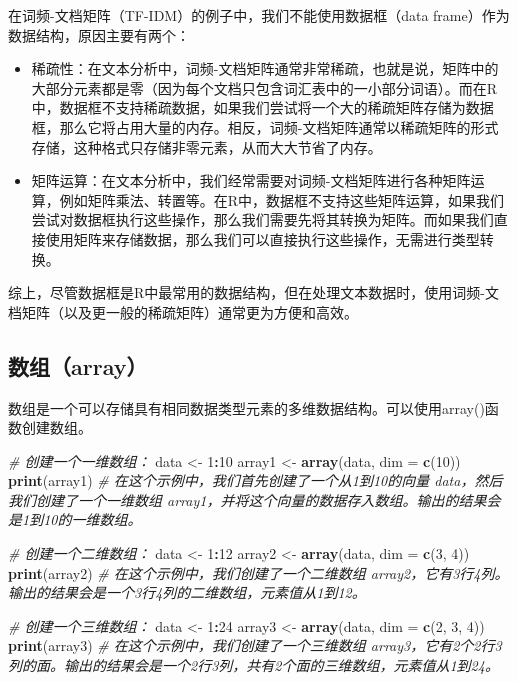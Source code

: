 \documentclass[]{book}
\newenvironment{Shaded}{\begin{snugshade}}{\end{snugshade}}
\newcommand{\CommentTok}[1]{\textcolor[rgb]{0.56,0.35,0.01}{\textit{#1}}}
\newcommand{\DataTypeTok}[1]{\textcolor[rgb]{0.13,0.29,0.53}{#1}}
\newcommand{\DecValTok}[1]{\textcolor[rgb]{0.00,0.00,0.81}{#1}}
\newcommand{\KeywordTok}[1]{\textcolor[rgb]{0.13,0.29,0.53}{\textbf{#1}}}
\newcommand{\NormalTok}[1]{#1}
\newcommand{\OperatorTok}[1]{\textcolor[rgb]{0.81,0.36,0.00}{\textbf{#1}}}
\newcommand{\StringTok}[1]{\textcolor[rgb]{0.31,0.60,0.02}{#1}}
\begin{document}
在词频-文档矩阵（TF-IDM）的例子中，我们不能使用数据框（data frame）作为数据结构，原因主要有两个：

\begin{itemize}
\item
  稀疏性：在文本分析中，词频-文档矩阵通常非常稀疏，也就是说，矩阵中的大部分元素都是零（因为每个文档只包含词汇表中的一小部分词语）。而在R中，数据框不支持稀疏数据，如果我们尝试将一个大的稀疏矩阵存储为数据框，那么它将占用大量的内存。相反，词频-文档矩阵通常以稀疏矩阵的形式存储，这种格式只存储非零元素，从而大大节省了内存。
\item
  矩阵运算：在文本分析中，我们经常需要对词频-文档矩阵进行各种矩阵运算，例如矩阵乘法、转置等。在R中，数据框不支持这些矩阵运算，如果我们尝试对数据框执行这些操作，那么我们需要先将其转换为矩阵。而如果我们直接使用矩阵来存储数据，那么我们可以直接执行这些操作，无需进行类型转换。
\end{itemize}

综上，尽管数据框是R中最常用的数据结构，但在处理文本数据时，使用词频-文档矩阵（以及更一般的稀疏矩阵）通常更为方便和高效。

\hypertarget{ux6570ux7ec4array}{%
\subsection{数组（array）}\label{ux6570ux7ec4array}}

数组是一个可以存储具有相同数据类型元素的多维数据结构。可以使用array()函数创建数组。

\begin{Shaded}
\begin{Highlighting}[]
\CommentTok{# 创建一个一维数组：}
\NormalTok{data <-}\StringTok{ }\DecValTok{1}\OperatorTok{:}\DecValTok{10}
\NormalTok{array1 <-}\StringTok{ }\KeywordTok{array}\NormalTok{(data, }\DataTypeTok{dim =} \KeywordTok{c}\NormalTok{(}\DecValTok{10}\NormalTok{))}
\KeywordTok{print}\NormalTok{(array1)}
\CommentTok{# 在这个示例中，我们首先创建了一个从1到10的向量 data，然后我们创建了一个一维数组 array1，并将这个向量的数据存入数组。输出的结果会是1到10的一维数组。}

\CommentTok{# 创建一个二维数组：}
\NormalTok{data <-}\StringTok{ }\DecValTok{1}\OperatorTok{:}\DecValTok{12}
\NormalTok{array2 <-}\StringTok{ }\KeywordTok{array}\NormalTok{(data, }\DataTypeTok{dim =} \KeywordTok{c}\NormalTok{(}\DecValTok{3}\NormalTok{, }\DecValTok{4}\NormalTok{))}
\KeywordTok{print}\NormalTok{(array2)}
\CommentTok{# 在这个示例中，我们创建了一个二维数组 array2，它有3行4列。输出的结果会是一个3行4列的二维数组，元素值从1到12。}

\CommentTok{# 创建一个三维数组：}
\NormalTok{data <-}\StringTok{ }\DecValTok{1}\OperatorTok{:}\DecValTok{24}
\NormalTok{array3 <-}\StringTok{ }\KeywordTok{array}\NormalTok{(data, }\DataTypeTok{dim =} \KeywordTok{c}\NormalTok{(}\DecValTok{2}\NormalTok{, }\DecValTok{3}\NormalTok{, }\DecValTok{4}\NormalTok{))}
\KeywordTok{print}\NormalTok{(array3)}
\CommentTok{# 在这个示例中，我们创建了一个三维数组 array3，它有2个2行3列的面。输出的结果会是一个2行3列，共有2个面的三维数组，元素值从1到24。}
\end{Highlighting}
\end{Shaded}
\end{document}
